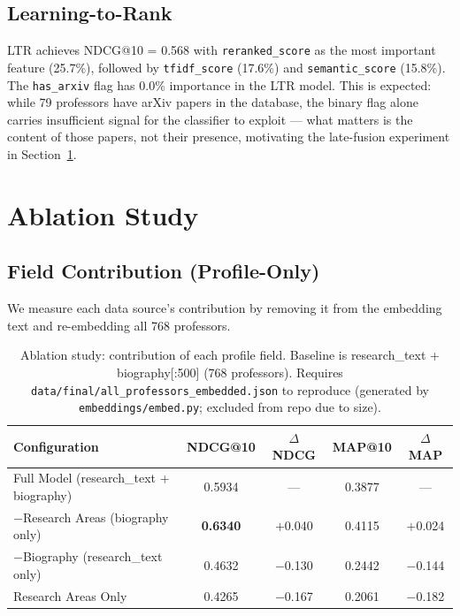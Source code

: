 \documentclass[11pt,a4paper]{article}
\begin{document}
\subsection{Learning-to-Rank}

LTR achieves NDCG@10 = 0.568 with \texttt{reranked\_score} as the most
important feature (25.7\%), followed by \texttt{tfidf\_score} (17.6\%) and
\texttt{semantic\_score} (15.8\%). The \texttt{has\_arxiv} flag has 0.0\%
importance in the LTR model. This is expected: while 79 professors have
arXiv papers in the database, the binary flag alone carries insufficient
signal for the classifier to exploit --- what matters is the content of
those papers, not their presence, motivating the late-fusion experiment in
Section~\ref{sec:ablation}.

\section{Ablation Study}
\label{sec:ablation}

\subsection{Field Contribution (Profile-Only)}

We measure each data source's contribution by removing it from the
embedding text and re-embedding all 768 professors.

\begin{table}[H]
\centering
\caption{Ablation study: contribution of each profile field.
Baseline is research\_text + biography[:500] (768 professors).
Requires \texttt{data/final/all\_professors\_embedded.json} to reproduce
(generated by \texttt{embeddings/embed.py}; excluded from repo due to size).}
\label{tab:ablation}
\begin{tabular}{lcccc}
\toprule
\textbf{Configuration} & \textbf{NDCG@10} & \textbf{$\Delta$ NDCG} &
\textbf{MAP@10} & \textbf{$\Delta$ MAP} \\
\midrule
Full Model (research\_text + biography)  & 0.5934 & ---       & 0.3877 & ---      \\
$-$Research Areas (biography only)       & \textbf{0.6340} & $+$0.040 & 0.4115 & $+$0.024 \\
$-$Biography (research\_text only)       & 0.4632 & $-$0.130  & 0.2442 & $-$0.144 \\
Research Areas Only                      & 0.4265 & $-$0.167  & 0.2061 & $-$0.182 \\
\bottomrule
\end{tabular}
\end{table}
\end{document}

